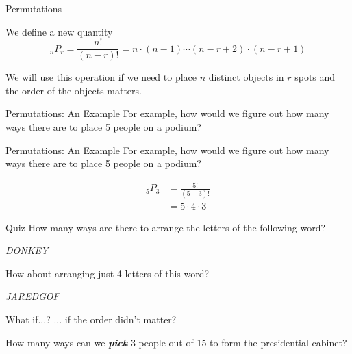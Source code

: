 \documentclass[aspectratio=169,xcolor=dvipsnames]{beamer}
\begin{document}
\begin{frame}[t]{Permutations}
    \begin{definition}
    We define a new quantity
    \[
        _nP_r=\frac{n!}{(n-r)!}=n\cdot(n-1)\cdots(n-r+2)\cdot(n-r+1)
    \]
    \end{definition}
    
    \vspace{1em}
    
    We will use this operation if we need to place $n$ distinct objects in $r$ spots and the order of the objects matters.
\end{frame}

\begin{frame}[t]{Permutations: An Example}
    For example, how would we figure out how many ways there are to place 5 people on a podium?
    
\end{frame}

\begin{frame}[t]{Permutations: An Example}
        For example, how would we figure out how many ways there are to place 5 people on a podium?

    \vspace{1cm}
    \begin{align*}
        _5P_3
        &=\frac{5!}{(5-3)!}\\
        &=5\cdot4\cdot3
    \end{align*}
\end{frame}
\begin{frame}[t]{Quiz}
    How many ways are there to arrange the letters of the following word?

    \vspace{0.5cm}
    \begin{center}
        \textit{DONKEY}
    \end{center}
    
    \vspace{1cm}
    How about arranging just 4 letters of this word?
    
    \vspace{0.5cm}
    \begin{center}
        \textit{JAREDGOF}
    \end{center}
\end{frame}
\begin{frame}[t]{What if...?}
    ... if the order didn't matter?
    
    \vspace{.5em}
    
    How many ways can we \textit{\textbf{pick}} 3 people out of 15 to form the presidential cabinet?
\end{frame}
\end{document}
